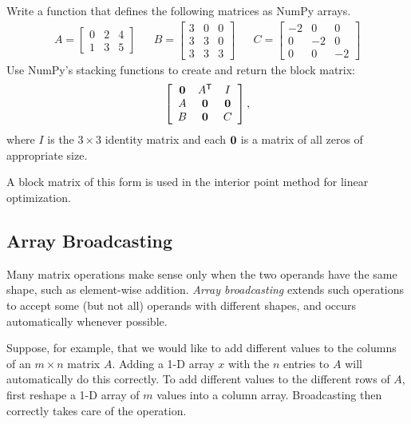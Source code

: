 \begin{problem} %
Write a function that defines the following matrices as NumPy arrays.
\begin{align*}
A = \left[\begin{array}{rrr}
0 & 2 & 4\\
1 & 3 & 5\end{array}\right]
&&
B = \left[\begin{array}{rrr}
3 & 0 & 0\\
3 & 3 & 0\\
3 & 3 & 3\end{array}\right]
&&
C = \left[\begin{array}{rrr}
-2 & 0 & 0\\
0 & -2 & 0\\
0 & 0 & -2\end{array}\right]
\end{align*}
Use NumPy's stacking functions to create and return the block matrix:
\begin{align*}
\left[\begin{array}{ccc}
\mathbf{0} & A^{\mathsf T} & I\\
A & \mathbf{0} & \mathbf{0} \\
B & \mathbf{0} & C \end{array}\right],
\end{align*}
where $I$ is the $3\times 3$ identity matrix and each $\mathbf{0}$ is a matrix of all zeros of appropriate size.

A block matrix of this form is used in the interior point method for linear optimization.
\end{problem}

\subsection*{Array Broadcasting} %

Many matrix operations make sense only when the two operands have the same shape, such as element-wise addition.
\emph{Array broadcasting} extends such operations to accept some (but not all) operands with different shapes, and occurs automatically whenever possible.

Suppose, for example, that we would like to add different values to the columns of an $m\times n$ matrix $A$.
Adding a 1-D array $x$ with the $n$ entries to $A$ will automatically do this correctly.
To add different values to the different rows of $A$, first reshape a 1-D array of $m$ values into a column array.
Broadcasting then correctly takes care of the operation.

